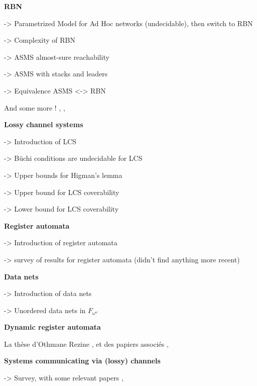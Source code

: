 	\textbf{RBN}
	
	\cite{DelzannoSZ2010Adhoc} -> Parametrized Model for Ad Hoc networks (undecidable), then switch to RBN
	
	\cite{Delzanno2012complexity} -> Complexity of RBN
	
	\cite{BouyerMRSS2016} -> ASMS almost-sure reachability
	
	\cite{fortin2017model} -> ASMS with stacks and leaders
	
	\cite{BalaW2021} -> Equivalence ASMS <-> RBN
	
	And some more ! \cite{BalasubramanianBM2018parameterized}, \cite{BalasubramanianGW2022parameterized}, 	\cite{ChiniMS2019liveness} 
	
	\textbf{Lossy channel systems}
	
	\cite{AbdullaJ1996verif} -> Introduction of LCS
	
	\cite{AbdullaJ1996undec} -> Büchi conditions are undecidable for LCS 
	
	\cite{SchmitzS2011upperHigman} -> Upper bounds for Higman's lemma
	
	\cite{ChambartS2008ordinal} -> Upper bound for LCS coverability 
	
	\cite{Schnoebelen2002verifying} -> Lower bound for LCS coverability 
	

	\textbf{Register automata}
	
	\cite{kaminski1994finite} -> Introduction of register automata
	
	\cite{segoufin2006automata} -> survey of results for register automata (didn't find anything more recent)
	
	\textbf{Data nets}
	
	\cite{lazic2007nets} -> Introduction of data nets
	
	\cite{ROSAVELARDO201741} -> Unordered data nets in $F_{\omega^\omega}$
	
	\textbf{Dynamic register automata}
	
	La thèse d'Othmane Rezine \cite{Rezine2017verification}, et des papiers associés 
	\cite{AbdullaAKR2014verification},
	\cite{AbdullaAKR2015verification}
	
	\textbf{Systems communicating via (lossy) channels}
	
	\cite{Aiswarya2021network} -> Survey, with some relevant papers 	\cite{Aiswarya2015model},
	\cite{AbdullaAA2016data}
	
